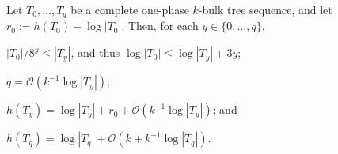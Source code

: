 \documentclass[kpfonts]{patmorin}
\newcommand{\Oh}{\mathcal{O}}
\let\le\leqslant
\begin{document}
\begin{lem}
Let $T_0,\dots,T_{q}$ be a complete one-phase $k$-bulk tree sequence, 
and let $r_0 := h(T_0)-\log|T_0|$.  Then, for each $y\in\{0,\dots,q\}$,
\begin{compactenum}[(i)]
\item $ |T_0|/8^y\le |T_y|$, and thus $\log|T_0| \le \log|T_y| + 3y$;\label{height-diff}
  \item $q=\Oh(k^{-1}\log|T_y|)$; \label{ystar-bound}
    \item $h(T_y) = \log|T_y| + r_0+\Oh(k^{-1}\log|T_y|) $; and
    \label{bulktree-height-item-i}
    \item $h(T_{q}) = \log|T_{q}|+\Oh(k+k^{-1}\log|T_{q}|)$.\label{bulktree-height-item-ii}
  \end{compactenum}
\end{lem}
\end{document}
